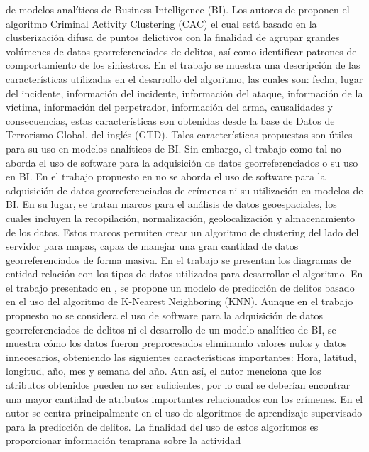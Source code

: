 de modelos analíticos de Business Intelligence (BI).
\bigbreak
Los autores de \cite{winPCPDParallelCrime2019} proponen el algoritmo Criminal Activity Clustering (CAC) el cual está basado
en la clusterización difusa de puntos delictivos con la finalidad de agrupar grandes volúmenes de datos georreferenciados de delitos,
así como identificar patrones de comportamiento de los siniestros. En el trabajo se muestra una descripción de las características
utilizadas en el desarrollo del algoritmo, las cuales son: fecha, lugar del incidente, información del incidente, información del ataque,
información de la víctima, información del perpetrador, información del arma, causalidades y consecuencias, estas características son
obtenidas desde la base de Datos de Terrorismo Global, del inglés (GTD). Tales características propuestas son útiles para su uso en modelos
analíticos de BI. Sin embargo, el trabajo como tal no aborda el uso de software para la adquisición de datos georreferenciados o
su uso en BI.
\bigbreak
En el trabajo propuesto en \cite{amirkhanyanMethodsFrameworksGeoSpatioTemporal2020} no se aborda el uso de software para la
adquisición de datos georreferenciados de crímenes ni su utilización en modelos de BI. En su lugar, se tratan marcos para el
análisis de datos geoespaciales, los cuales incluyen la recopilación, normalización, geolocalización y almacenamiento de los datos.
Estos marcos permiten crear un algoritmo de clustering del lado del servidor para mapas, capaz de manejar una gran cantidad de datos
georreferenciados de forma masiva. En el trabajo se presentan los diagramas de entidad-relación con los tipos de datos utilizados
para desarrollar el algoritmo.
\bigbreak
En el trabajo presentado en \cite{kumarCrimePredictionUsing2020}, se propone un modelo de predicción de delitos basado en el uso
del algoritmo de K-Nearest Neighboring (KNN). Aunque en el trabajo propuesto no se considera el uso de software para la adquisición de datos
georreferenciados de delitos ni el desarrollo de un modelo analítico de BI, se muestra cómo los datos fueron preprocesados eliminando
valores nulos y datos innecesarios, obteniendo las siguientes características importantes: Hora, latitud, longitud, año, mes y semana del año.
Aun así, el autor menciona que los atributos obtenidos pueden no ser suficientes, por lo cual se deberían encontrar una mayor cantidad
de atributos importantes relacionados con los crímenes.
\bigbreak
En \cite{hossainCrimePredictionUsing2020} el autor se centra principalmente en el uso de algoritmos de aprendizaje supervisado
para la predicción de delitos. La finalidad del uso de estos algoritmos es proporcionar información temprana sobre la actividad
